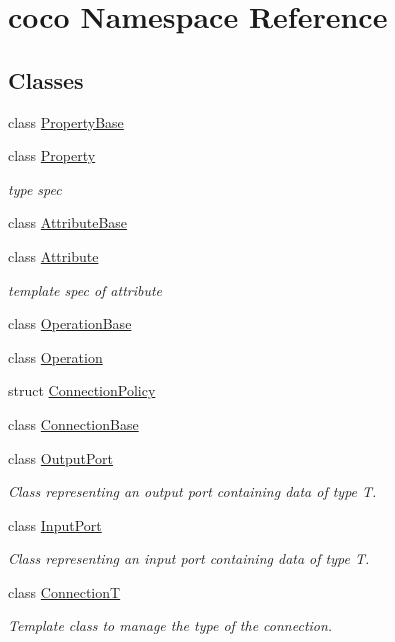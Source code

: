 \hypertarget{namespacecoco}{\section{coco Namespace Reference}
\label{namespacecoco}
}
\subsection*{Classes}
\begin{DoxyCompactItemize}
\item 
class \hyperlink{classcoco_1_1_property_base}{Property\-Base}
\item 
class \hyperlink{classcoco_1_1_property}{Property}
\begin{DoxyCompactList}\small\item\em type spec \end{DoxyCompactList}\item 
class \hyperlink{classcoco_1_1_attribute_base}{Attribute\-Base}
\item 
class \hyperlink{classcoco_1_1_attribute}{Attribute}
\begin{DoxyCompactList}\small\item\em template spec of attribute \end{DoxyCompactList}\item 
class \hyperlink{classcoco_1_1_operation_base}{Operation\-Base}
\item 
class \hyperlink{classcoco_1_1_operation}{Operation}
\item 
struct \hyperlink{structcoco_1_1_connection_policy}{Connection\-Policy}
\item 
class \hyperlink{classcoco_1_1_connection_base}{Connection\-Base}
\item 
class \hyperlink{classcoco_1_1_output_port}{Output\-Port}
\begin{DoxyCompactList}\small\item\em Class representing an output port containing data of type T. \end{DoxyCompactList}\item 
class \hyperlink{classcoco_1_1_input_port}{Input\-Port}
\begin{DoxyCompactList}\small\item\em Class representing an input port containing data of type T. \end{DoxyCompactList}\item 
class \hyperlink{classcoco_1_1_connection_t}{Connection\-T}
\begin{DoxyCompactList}\small\item\em Template class to manage the type of the connection. \end{DoxyCompactList}\item 

\end{DoxyCompactItemize}
